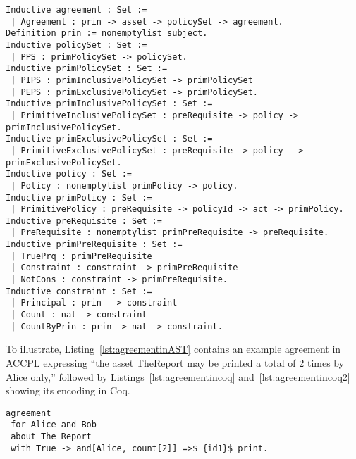 \documentclass[runningheads,a4paper]{llncs}
\begin{document}
\lstset{language=Coq}
\begin{lstlisting}[frame=single, caption={ACCPL: Coq Version of Agreement},label={lst:agreementcoq}]
Inductive agreement : Set :=
 | Agreement : prin -> asset -> policySet -> agreement.
Definition prin := nonemptylist subject.
Inductive policySet : Set :=
 | PPS : primPolicySet -> policySet.
Inductive primPolicySet : Set :=
 | PIPS : primInclusivePolicySet -> primPolicySet
 | PEPS : primExclusivePolicySet -> primPolicySet.
Inductive primInclusivePolicySet : Set :=
 | PrimitiveInclusivePolicySet : preRequisite -> policy -> primInclusivePolicySet.
Inductive primExclusivePolicySet : Set :=
 | PrimitiveExclusivePolicySet : preRequisite -> policy  -> primExclusivePolicySet.
Inductive policy : Set :=
 | Policy : nonemptylist primPolicy -> policy.
Inductive primPolicy : Set :=
 | PrimitivePolicy : preRequisite -> policyId -> act -> primPolicy.  
Inductive preRequisite : Set :=
 | PreRequisite : nonemptylist primPreRequisite -> preRequisite.
Inductive primPreRequisite : Set :=
 | TruePrq : primPreRequisite
 | Constraint : constraint -> primPreRequisite
 | NotCons : constraint -> primPreRequisite.
Inductive constraint : Set :=
 | Principal : prin  -> constraint 
 | Count : nat -> constraint 
 | CountByPrin : prin -> nat -> constraint.  
\end{lstlisting}

To illustrate, Listing~\ref{lst:agreementinAST} contains an example
agreement in ACCPL expressing ``the asset TheReport may be printed a
total of 2 times by Alice only,'' followed by
Listings~\ref{lst:agreementincoq} and~\ref{lst:agreementincoq2}
showing its encoding in Coq.

\lstset{language=Pucella2006}
\begin{lstlisting}[frame=single, caption={Example Agreement for Alice and Bob}, label={lst:agreementinAST}, mathescape]
agreement
 for Alice and Bob
 about The Report
 with True -> and[Alice, count[2]] =>$_{id1}$ print.
\end{lstlisting}
\end{document}
